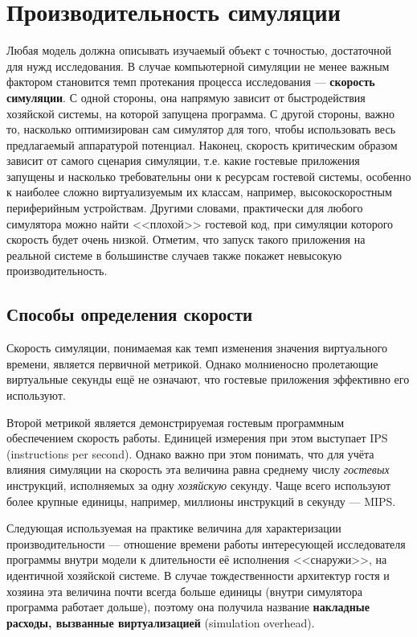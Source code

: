 \section{Производительность симуляции}


Любая модель должна описывать изучаемый объект с точностью, достаточной для нужд исследования. В случае компьютерной симуляции не менее важным фактором становится темп протекания процесса исследования --- \textbf{скорость симуляции}. С одной стороны, она напрямую зависит от быстродействия хозяйской системы, на которой запущена программа. С другой стороны, важно то, насколько оптимизирован сам симулятор для того, чтобы использовать весь предлагаемый аппаратурой потенциал. Наконец, скорость критическим образом зависит от самого сценария симуляции, т.е. какие гостевые приложения запущены и насколько требовательны они к ресурсам гостевой системы, особенно к наиболее сложно виртуализуемым их классам, например, высокоскоростным периферийным устройствам. Другими словами, практически для любого симулятора можно найти <<плохой>> гостевой код, при симуляции которого скорость будет очень низкой. Отметим, что запуск такого приложения на реальной системе в большинстве случаев также покажет невысокую производительность.

\subsection{Способы определения скорости}

Скорость симуляции, понимаемая как темп изменения значения виртуального времени, является первичной метрикой. Однако молниеносно пролетающие виртуальные секунды ещё не означают, что гостевые приложения эффективно его используют. 

Второй метрикой является демонстрируемая гостевым программным обеспечением скорость работы. Единицей измерения при этом выступает IPS (\abbr instructions per second). Однако важно при этом понимать, что для учёта влияния симуляции на скорость эта величина равна среднему числу \emph{гостевых} инструкций, исполняемых за одну \emph{хозяйскую} секунду. Чаще всего используют более крупные единицы, например, миллионы инструкций в секунду --- MIPS.

Следующая используемая на практике величина для характеризации производительности --- отношение времени работы интересующей исследователя программы внутри модели к длительности её исполнения <<снаружи>>, на идентичной хозяйской системе. В случае тождественности архитектур гостя и хозяина эта величина почти всегда больше единицы (внутри симулятора программа работает дольше), поэтому она получила название \textbf{накладные расходы, вызванные виртуализацией} (\abbr simulation overhead). 

